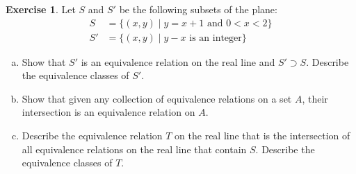 \documentclass[11pt,a4paper,twoside]{article}
\theoremstyle{definition}
\newcounter{excounter}
\newtheorem{exercise}[excounter]{Exercise}
\begin{document}
\begin{exercise}

  Let $S$ and $S'$ be the following subsets of the plane:
  \begin{align*}
    S &= \big\{ (x, y) \mid y = x + 1 \text{ and } 0 < x < 2 \big\} \\
    S' &= \big\{ (x, y) \mid y - x \text{ is an integer} \big\}
  \end{align*}
  \begin{enumerate}[(a)]
  \item Show that $S'$ is an equivalence relation on the real line and $S' \supset S$. Describe the equivalence classes of $S'$.
  \item Show that given any collection of equivalence relations on a set $A$, their intersection is an equivalence relation on $A$.
  \item Describe the equivalence relation $T$ on the real line that is the intersection of all equivalence relations on the real line
    that contain $S$. Describe the equivalence classes of $T$.
  \end{enumerate}

\end{exercise}
\end{document}
